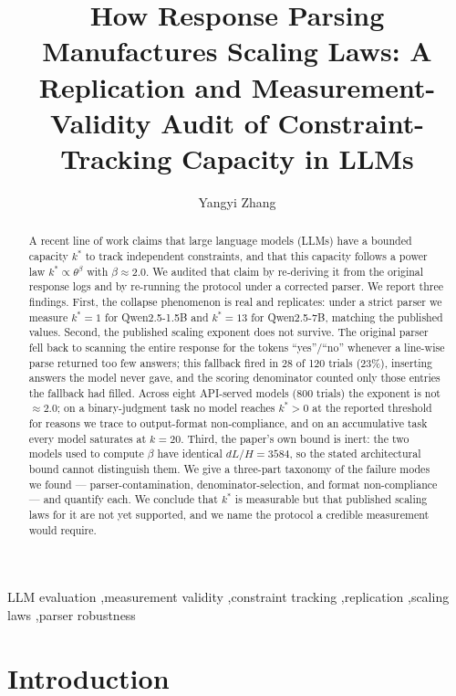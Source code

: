 \documentclass[preprint,12pt]{elsarticle}
\theoremstyle{plain}
\begin{document}
\begin{frontmatter}
\title{How Response Parsing Manufactures Scaling Laws: A Replication and Measurement-Validity Audit of Constraint-Tracking Capacity in LLMs}

\author[gu]{Yangyi Zhang}
\address[gu]{Georgetown University, Washington, DC 20057, USA}

\begin{abstract}
A recent line of work claims that large language models (LLMs) have a bounded capacity $k^*$ to track independent constraints, and that this capacity follows a power law $k^* \propto \theta^{\beta}$ with $\beta \approx 2.0$. We audited that claim by re-deriving it from the original response logs and by re-running the protocol under a corrected parser. We report three findings. First, the collapse phenomenon is real and replicates: under a strict parser we measure $k^* = 1$ for Qwen2.5-1.5B and $k^* = 13$ for Qwen2.5-7B, matching the published values. Second, the published scaling exponent does not survive. The original parser fell back to scanning the entire response for the tokens ``yes''/``no'' whenever a line-wise parse returned too few answers; this fallback fired in 28 of 120 trials (23\%), inserting answers the model never gave, and the scoring denominator counted only those entries the fallback had filled. Across eight API-served models (800 trials) the exponent is not $\approx 2.0$; on a binary-judgment task no model reaches $k^* > 0$ at the reported threshold for reasons we trace to output-format non-compliance, and on an accumulative task every model saturates at $k = 20$. Third, the paper's own bound is inert: the two models used to compute $\beta$ have identical $dL/H = 3584$, so the stated architectural bound cannot distinguish them. We give a three-part taxonomy of the failure modes we found --- parser-contamination, denominator-selection, and format non-compliance --- and quantify each. We conclude that $k^*$ is measurable but that published scaling laws for it are not yet supported, and we name the protocol a credible measurement would require.
\end{abstract}
\begin{keyword}
LLM evaluation \sep measurement validity \sep constraint tracking \sep replication \sep scaling laws \sep parser robustness
\end{keyword}
\end{frontmatter}

\section{Introduction}
\label{sec:intro}
\end{document}
